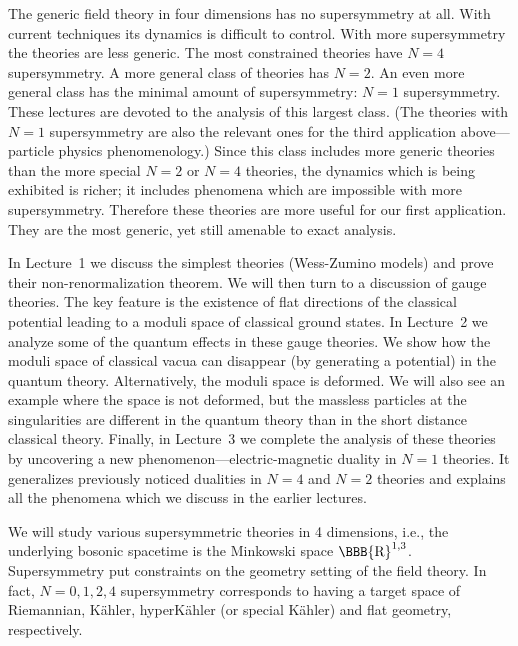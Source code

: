\documentclass[lecture]{qft-l}
\newcommand{\RE}{{\mbox{\BBB{R}}}}
\newcommand{\ka}{K\"ahler }
\numberwithin{figure}{chapter}
\begin{document}
The generic field theory in four dimensions has no supersymmetry at
all.  With current techniques its dynamics is difficult to control.
With more supersymmetry the theories are less generic.  The most
constrained theories have $N=4$ supersymmetry.  A more general class
of theories has $N=2$.  An even more general class has the minimal
amount of supersymmetry: $N=1$ supersymmetry.  These lectures are
devoted to the analysis of this largest class.  (The theories with
$N=1$ supersymmetry are also the relevant ones for the third
application above---particle physics phenomenology.)  Since this
class includes more generic theories than the more special $N=2$ or
$N=4$ theories, the dynamics which is being exhibited is richer; it
includes phenomena which are impossible with more supersymmetry.
Therefore these theories are more useful for our first application.
They are the most generic, yet still amenable to exact analysis.

In Lecture~1 we discuss the simplest theories (Wess-Zumino models) and prove
their non-renormalization theorem.  We will then turn to a discussion of
gauge theories.  The key feature is the existence of flat directions of the
classical potential leading to a moduli space of classical ground states.  In
Lecture~2 we analyze some of the quantum effects in these gauge theories.  We
show how the moduli space of classical vacua can disappear (by generating a
potential) in the quantum theory.  Alternatively, the moduli space is
deformed.  We will also see an example where the space is not deformed, but
the massless particles at the singularities are different in the quantum
theory than in the short distance classical theory.  Finally, in Lecture~3 we
complete the analysis of these theories by uncovering a new
phenomenon---electric-magnetic duality in $N=1$ theories.  It generalizes
previously noticed dualities in $N=4$ and $N=2$ theories and explains all the
phenomena which we discuss in the earlier lectures.




We will study various supersymmetric theories in 4 dimensions,
i.e., the underlying bosonic spacetime is the Minkowski space $\RE^{1,3}$.
Supersymmetry put constraints on the geometry setting of the field theory.
In fact, $N=0,1,2,4$ supersymmetry corresponds to having a target space of
Riemannian, K\"ahler, hyper\ka (or special K\"ahler) and flat geometry,
respectively.
\end{document}
